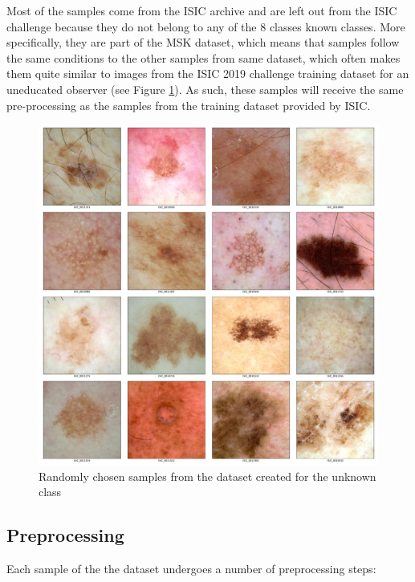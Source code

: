     Most of the samples come from the ISIC archive and are left out from the ISIC challenge because they do not belong to any of the 8 classes known classes. More specifically, they are part of the MSK dataset, which means that samples follow the same conditions to the other samples from same dataset, which often makes them quite similar to images from the ISIC 2019 challenge training dataset for an uneducated observer (see Figure \ref{fig:unknown_samples}). As such, these samples will receive the same pre-processing as the samples from the training dataset provided by ISIC. \par
    
    \begin{figure}[h!]
        \centering
        \includegraphics[width=\textwidth]{figs/unknown_image_samples.pdf}
        \caption{Randomly chosen samples from the dataset created for the unknown class}
        \label{fig:unknown_samples}
    \end{figure}


\subsection{Preprocessing}
\label{subsection:preprocessing}
    Each sample of the the dataset undergoes a number of preprocessing steps:
    

